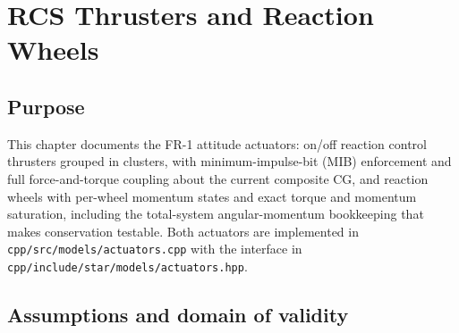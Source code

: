 \chapter{RCS Thrusters and Reaction Wheels}
\label{ch:actuators}

\section{Purpose}
\label{sec:actuators:purpose}

This chapter documents the FR-1 attitude actuators: on/off reaction
control thrusters grouped in clusters, with minimum-impulse-bit (MIB)
enforcement and full force-and-torque coupling about the current
composite CG, and reaction wheels with per-wheel momentum states and
exact torque and momentum saturation, including the total-system
angular-momentum bookkeeping that makes conservation testable. Both
actuators are implemented in \texttt{cpp/src/models/actuators.cpp} with
the interface in \texttt{cpp/include/star/models/actuators.hpp}.

\section{Assumptions and domain of validity}
\label{sec:actuators:domain}

